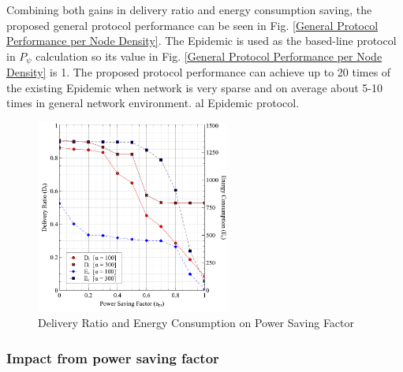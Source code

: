 \documentclass[conference]{IEEEtran}
\begin{document}
Combining both gains in delivery ratio and energy consumption saving, the proposed general protocol performance can be seen in Fig. \ref{General Protocol Performance per Node Density}. 
%
The Epidemic is used as the based-line protocol in $P_{\psi}$ calculation so its value in Fig. \ref{General Protocol Performance per Node Density} is 1.
%
The proposed protocol performance can achieve up to 20 times of the existing Epidemic when network is very sparse and on average about 5-10 times in general network environment.
al Epidemic protocol.

\begin{figure}[!t]
\centering
\includegraphics[width=2.5in]{Graphs/NpsDeliveryPerformanceAndDeliveryRatio.pdf}
\caption{Delivery Ratio and Energy Consumption on Power Saving Factor}
\label{The Optimum between Delivery Ratio and protocol Performance}
\end{figure}

\subsubsection{Impact from power saving factor}
\end{document}
